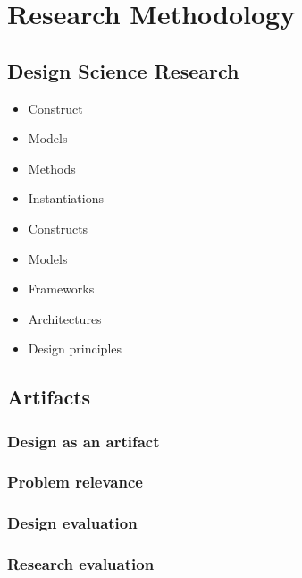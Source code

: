 \documentclass[../Main/thesis.tex]{subfiles}
\begin{document}
\chapter{Research Methodology}\label{ch:methodology}

\section{Design Science Research}%
\label{sec:design_science_research}

\begin{itemize}
    \item Construct
    \item Models
    \item Methods
    \item Instantiations
\end{itemize}

\begin{itemize}
    \item Constructs
    \item Models
    \item Frameworks
    \item Architectures
    \item Design principles
\end{itemize}

\section{Artifacts}%
\label{sec:artifacts}

\subsection*{Design as an artifact}%
\label{sub:design_as_an_artifact}

\subsection*{Problem relevance}%
\label{sub:problem_relevance}

\subsection*{Design evaluation}%
\label{sub:design_evaluation}

\subsection*{Research evaluation}%
\label{sub:research_evaluation}
\end{document}
